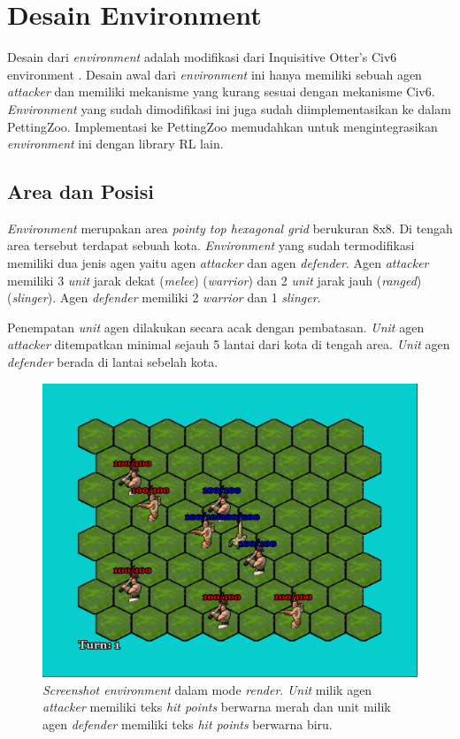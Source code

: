 \section{Desain Environment}
Desain dari \emph{environment} adalah modifikasi dari Inquisitive Otter's Civ6 environment \citep{civ6Environment}. 
Desain awal dari \emph{environment} ini hanya memiliki sebuah agen \emph{attacker} dan memiliki mekanisme yang kurang sesuai dengan mekanisme Civ6.
\emph{Environment} yang sudah dimodifikasi ini juga sudah diimplementasikan ke dalam PettingZoo.
Implementasi ke PettingZoo memudahkan untuk mengintegrasikan \emph{environment} ini dengan library RL lain.

\subsection{Area dan Posisi}
\emph{Environment} merupakan area \emph{pointy top hexagonal grid} berukuran 8x8. Di tengah area tersebut terdapat sebuah kota.
\emph{Environment} yang sudah termodifikasi memiliki dua jenis agen yaitu agen \emph{attacker} dan agen \emph{defender}.
Agen \emph{attacker} memiliki 3 \emph{unit} jarak dekat (\emph{melee}) (\emph{warrior}) dan 2 \emph{unit} jarak jauh (\emph{ranged}) (\emph{slinger}).
Agen \emph{defender} memiliki 2 \emph{warrior} dan 1 \emph{slinger}.

Penempatan \emph{unit} agen dilakukan secara acak dengan pembatasan.
\emph{Unit} agen \emph{attacker} ditempatkan minimal sejauh 5 lantai dari kota di tengah area.
\emph{Unit} agen \emph{defender} berada di lantai sebelah kota.


\begin{figure}[H]
  \centering
    \includegraphics[scale=0.3]{gambar/environment_screenshot.png}
    \caption{\emph{Screenshot environment} dalam mode \emph{render}. \emph{Unit} milik agen \emph{attacker} memiliki teks \emph{hit points} berwarna merah dan unit milik agen \emph{defender} memiliki teks \emph{hit points} berwarna biru.}
    \label{fig:environmentScreenshot}
\end{figure}

